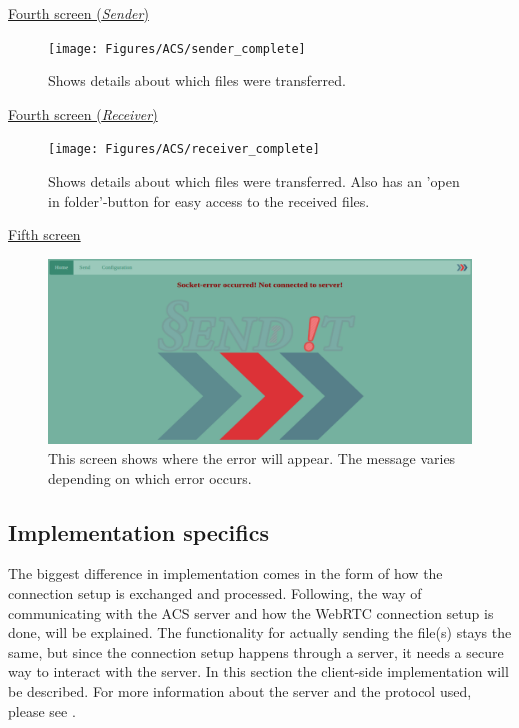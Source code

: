 %
\noindent
\underline{Fourth screen (\emph{Sender})}
\begin{figure}[H]
  \centering
  \texttt{[image: Figures/ACS/sender\_complete]}
  \decoRule
  \caption[Final screen Sender]{Shows details about which files were transferred.}
  \label{fig:ACS_rec1}
\end{figure}

%
\noindent
\underline{Fourth screen (\emph{Receiver})}
\begin{figure}[H]
  \centering
  \texttt{[image: Figures/ACS/receiver\_complete]}
  \decoRule
  \caption[Final screen Receiver]{Shows details about which files were transferred. Also has an 'open in folder'-button for easy access to the received files.}
  \label{fig:ACS_rec2}
\end{figure}

%
\noindent
\underline{Fifth screen}
\begin{figure}[H]
  \centering
  \includegraphics[width=\textwidth]{Figures/ACS/error}
  \decoRule
  \caption[Error screen]{This screen shows where the error will appear. The message varies depending on which error occurs.}
  \label{fig:ACS_err}
\end{figure}

%
\subsection{Implementation specifics}
\label{sec:acsimp}
%
The biggest difference in implementation comes in the form of how the connection setup is exchanged and processed. Following, the way of communicating with the ACS server and how the WebRTC connection setup is done, will be explained. The functionality for actually sending the file(s) stays the same, but since the connection setup happens through a server, it needs a secure way to interact with the server. In this section the client-side implementation will be described. For more information about the server and the protocol used, please see . 
%
